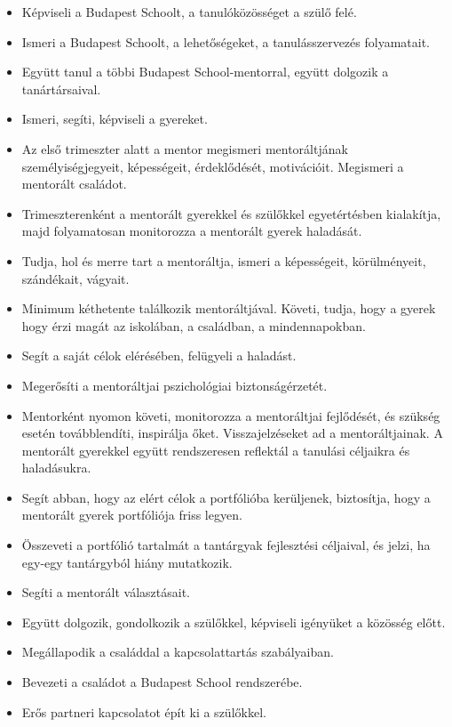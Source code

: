 \begin{itemize}
\tightlist
\item
  Képviseli a Budapest Schoolt, a tanulóközösséget a szülő felé.
\item
    Ismeri a Budapest Schoolt, a lehetőségeket, a tanulásszervezés
    folyamatait.
\item
  Együtt tanul a többi Budapest School-mentorral, együtt dolgozik a
  tanártársaival.
\item
  Ismeri, segíti, képviseli a gyereket.
\item
  Az első trimeszter alatt a mentor megismeri mentoráltjának
  személyiségjegyeit, képességeit, érdeklődését, motivációit. Megismeri
  a mentorált családot.
\item
  Trimeszterenként a mentorált gyerekkel és szülőkkel egyetértésben
  kialakítja, majd folyamatosan monitorozza a mentorált gyerek
  haladását.
\item
  Tudja, hol és merre tart a mentoráltja, ismeri a képességeit,
  körülményeit, szándékait, vágyait.
\item
  Minimum kéthetente találkozik mentoráltjával. Követi, tudja, hogy a
  gyerek hogy érzi magát az iskolában, a családban, a mindennapokban.
\item
  Segít a saját célok elérésében, felügyeli a haladást.
\item
  Megerősíti a mentoráltjai pszichológiai biztonságérzetét.
\item
  Mentorként nyomon követi, monitorozza a mentoráltjai fejlődését, és
  szükség esetén továbblendíti, inspirálja őket. Visszajelzéseket ad a
  mentoráltjainak. A mentorált gyerekkel
  együtt rendszeresen reflektál 
  a tanulási céljaikra és haladásukra.
\item
  Segít abban, hogy az elért célok a portfólióba kerüljenek, biztosítja,
  hogy a mentorált gyerek portfóliója friss legyen.
\item
  Összeveti a portfólió tartalmát a tantárgyak fejlesztési céljaival, és
  jelzi, ha egy-egy tantárgyból hiány mutatkozik.
\item
  Segíti a mentorált választásait.
\item
  Együtt dolgozik, gondolkozik a szülőkkel, képviseli igényüket a
  közösség előtt.
\item
  Megállapodik a családdal a kapcsolattartás szabályaiban.
\item
  Bevezeti a családot a Budapest School rendszerébe.
\item
  Erős partneri kapcsolatot épít ki a szülőkkel.

\end{itemize}
